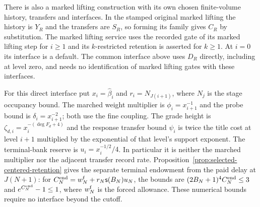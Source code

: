 There is also a marked lifting construction with its own chosen
finite-volume history, transfers and interfaces. In the stamped original
marked lifting the history is $Y_R$ and the transfers are $S_R$, so
forming its family gives $C_R$ by substitution. The marked lifting
service uses the recorded gate of its marked lifting step for $i\ge1$
and its $k$-restricted retention is asserted for $k\ge1$.
At $i=0$ its interface is a default. The common interface above uses
$D_R$ directly, including at level zero, and needs no identification
of marked lifting gates with these interfaces.

For this direct interface put $x_i=\widehat\beta_i$ and
$r_i=N_{J(i+1)}$, where $N_j$ is the stage occupancy bound.
The marched weight multiplier is $\phi_i=x_{i+1}^{-1}$ and the
probe bound is $\delta_i=x_{i+1}^{-2}$; both use the fine coupling.
The grade height is
$\zeta_{d,i}=x_i^{-(\deg F_d+4)}$ and the response transfer bound
$\psi_i$ is twice the title cost at level $i+1$ multiplied by
the exponential of that level's support exponent.
The terminal-bank reserve is $u_i=x_i^{-1/2}/4$.
In particular it is neither the marched multiplier nor the
adjacent transfer record rate. Proposition~\ref{prop:selected-centered-retention}
gives the separate terminal endowment from the paid delay at $J(N+1)$:
for $C_N^{\rm end}=w_N^{\rm f}+r_N\mathsf s(B_N)u_N$,
the bounds are $(2B_N+1)^4 C_N^{\rm end}\le3$ and
$e^{C_N^{\rm end}}-1\le1$, where $w_N^{\rm f}$ is the forced
allowance. These numerical bounds require no interface beyond the cutoff.

